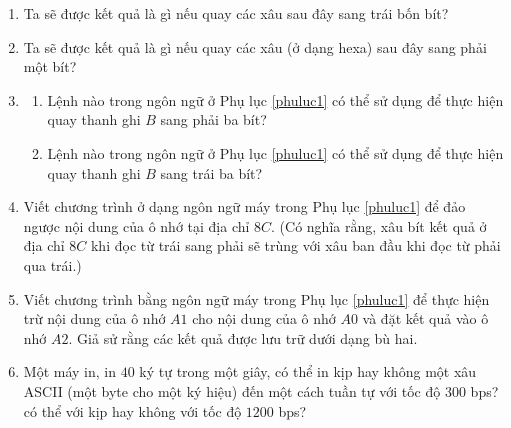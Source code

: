 \begin{multicols}{2}
\begin{enumerate}
  \item Ta sẽ được kết quả là gì nếu quay các xâu sau đây sang trái bốn bít?


  \item Ta sẽ được kết quả là gì nếu quay các xâu (ở dạng hexa) sau đây sang phải một bít?


  \item
    \begin{enumerate}
    \item Lệnh nào trong ngôn ngữ ở Phụ lục \ref{phuluc1} có thể sử dụng để thực hiện quay
      thanh ghi $B$ sang phải ba bít?

    \item Lệnh nào trong ngôn ngữ ở Phụ lục \ref{phuluc1} có thể sử dụng để thực hiện quay
      thanh ghi $B$ sang trái ba bít?
    \end{enumerate}

  \item Viết chương trình ở dạng ngôn ngữ máy trong Phụ lục \ref{phuluc1} để đảo ngược nội
    dung của ô nhớ tại địa chỉ $8C$. (Có nghĩa rằng, xâu bít kết quả ở địa chỉ $8C$ khi
    đọc từ trái sang phải sẽ trùng với xâu ban đầu khi đọc từ phải qua trái.)


  \item Viết chương trình bằng ngôn ngữ máy trong Phụ lục \ref{phuluc1} để thực hiện trừ
    nội dung của ô nhớ $A1$ cho nội dung của ô nhớ $A0$ và đặt kết quả vào ô nhớ $A2$.
    Giả sử rằng các kết quả được lưu trữ dưới dạng bù hai.

  \item Một máy in, in $40$ ký tự trong một giây, có thể in kịp hay không một xâu ASCII
    (một byte cho một ký hiệu) đến một cách tuần tự với tốc độ $300$ bps? có thể với kịp
    hay không với tốc độ $1200$ bps?


\end{enumerate}
\end{multicols}
